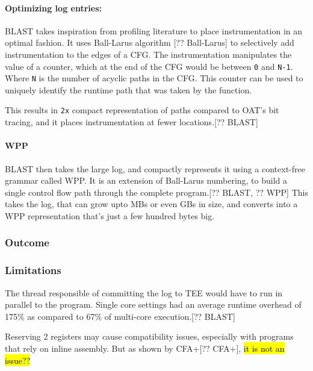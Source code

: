 \documentclass[a4paper, nobind]{templates/ociamthesis}
\begin{document}
\paragraph{Optimizing log entries:}\label{optimizing-log-entries}

BLAST takes inspiration from profiling literature to place instrumentation in
an optimal fashion. It uses Ball-Larus algorithm {[}?? Ball-Larus{]} to selectively
add instrumentation to the edges of a CFG. The instrumentation manipulates the value of a counter,
which at the end of the CFG would be between \texttt{0} and \texttt{N-1}. Where \texttt{N} is the number
of acyclic paths in the CFG. This counter can be used to uniquely identify the
runtime path that was taken by the function.

This results in \texttt{2x} compact representation of paths compared to OAT's bit tracing,
and it places instrumentation at fewer locations.{[}?? BLAST{]}

\paragraph{WPP}\label{wpp}

BLAST then takes the large log, and compactly represents it using a context-free
grammar called WPP. It is an extension of Ball-Larus numbering, to build a single
control flow path through the complete program.{[}?? BLAST, ?? WPP{]}
This takes the log, that can grow upto MBs or even GBs in size, and converts into
a WPP representation that's just a few hundred bytes big.

\subsubsection{Outcome}\label{outcome}

\subsubsection{Limitations}\label{limitations}

The thread responsible of committing the log to TEE would have to run in parallel
to the program. Single core settings had an average runtime overhead of 175\%
as compared to 67\% of multi-core execution.{[}?? BLAST{]}

Reserving 2 registers may cause compatibility issues, especially with programs
that rely on inline assembly. But as shown by CFA+{[}?? CFA+{]},
\hl{it is not an issue??}
\end{document}
